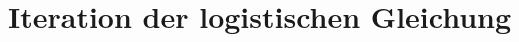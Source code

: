 %
%
%
\chapter{Iteration der logistischen Gleichung\label{chapter:logistic}}
\begin{refsection}






\printbibliography[heading=subbibliography]
\end{refsection}
